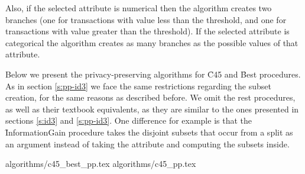 Also, if the selected attribute is numerical then the algorithm creates two branches (one for transactions with value less than the threshold, and one for transactions with value greater than the threshold).
If the selected attribute is categorical the algorithm creates as many branches as the possible values of that attribute.

Below we present the privacy\hyp preserving algorithms for \f{C45} and \f{Best} procedures.
As in section \ref{s:pp-id3} we face the same restrictions regarding the subset creation, for the same reasons as described before.
We omit the rest procedures, as well as their textbook equivalents, as they are similar to the ones presented in sections \ref{s:id3} and \ref{s:pp-id3}.
One difference for example is that the \f{InformationGain} procedure takes the disjoint subsets that occur from a split as an argument instead of taking the attribute and computing the subsets inside.




{algorithms/c45_best_pp.tex}
{algorithms/c45_pp.tex}
